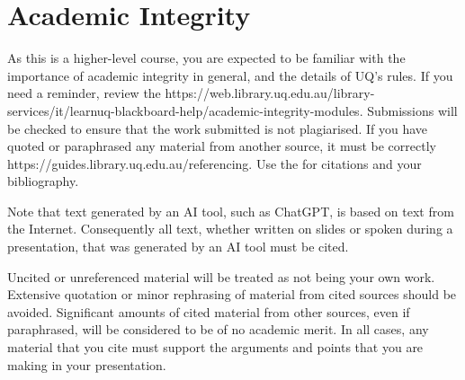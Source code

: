 \documentclass{csse4400}
\begin{document}
\section{Academic Integrity}
As this is a higher-level course, you are expected to be familiar with the importance of academic integrity in general,
and the details of UQ's rules.
If you need a reminder, review the 
{https://web.library.uq.edu.au/library-services/it/learnuq-blackboard-help/academic-integrity-modules}.
Submissions will be checked to ensure that the work submitted is not plagiarised.
If you have quoted or paraphrased any material from another source, it must be correctly 
{https://guides.library.uq.edu.au/referencing}.
Use the  for citations and your bibliography.

Note that text generated by an AI tool, such as ChatGPT, is based on text from the Internet.
Consequently all text, whether written on slides or spoken during a presentation,
that was generated by an AI tool must be cited.

Uncited or unreferenced material will be treated as not being your own work.
Extensive quotation or minor rephrasing of material from cited sources should be avoided.
Significant amounts of cited material from other sources, even if paraphrased, will be considered to be of no academic merit.
In all cases, any material that you cite must support the arguments and points that you are making in your presentation.







\end{document}
